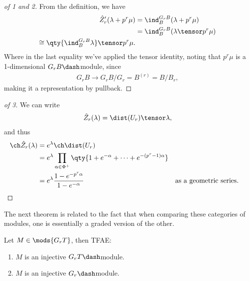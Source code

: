 \begin{proof}[of 1 and 2]

From the definition, we have
\begin{align*}  
\hat{Z}_r'(\lambda + p^r \mu)
&= \ind_{B}^{G_r B} (\lambda + p^r \mu) \\
&= \ind_{B}^{G_r B} (\lambda \tensor  p^r \mu) \\
\cong \qty{\ind_B^{G_r B} \lambda} \tensor p^r\mu
.\end{align*} Where in the last equality we've applied the tensor
identity, noting that \(p^r\mu\) is a 1-dimensional
\(G_r B\dash\)module, since
\begin{align*}  
G_r B \to G_r B/G_r = B^{(r)} = B/B_r
,\end{align*} making it a representation by pullback.

\end{proof}

\begin{proof}[of 3]

We can write
\begin{align*}  
\hat{Z}_r(\lambda) = \dist(U_r) \tensor \lambda
,\end{align*} and thus
\begin{align*}  
\ch \hat{Z}_r(\lambda) 
&= e^{\lambda} \ch \dist(U_r)  \\
&= e^{\lambda} \prod_{\alpha\in \Phi^+}\qty{ 1 + e^{-\alpha} + \cdots + e^{-(p^r-1)\alpha} } \\
&= e^\lambda {1 - e^{-p^r \alpha} \over 1 - e^{-\alpha}} && \text{as a geometric series}
.\end{align*}

\end{proof}

The next theorem is related to the fact that when comparing these
categories of modules, one is essentially a graded version of the other.

\begin{theorem}[?]

Let \(M\in\mods{G_rT}\), then TFAE:

\begin{enumerate}
\def\labelenumi{\arabic{enumi}.}
\tightlist
\item
  \(M\) is an injective \(G_r T\dash\)module.
\item
  \(M\) is an injective \(G_r\dash\)module.
\end{enumerate}

\end{theorem}

